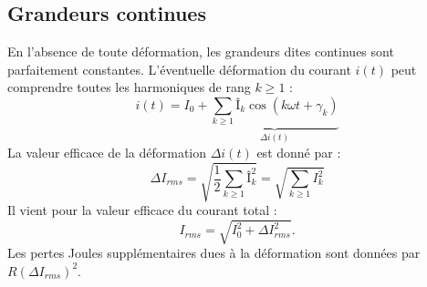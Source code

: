 	\subsection{Grandeurs continues}
		En l'absence de toute déformation, les grandeurs dites continues sont parfaitement constantes. L'éventuelle déformation du courant $i(t)$ peut comprendre toutes les harmoniques de rang $k\geq 1$ : 
		\begin{equation}
			i(t) = I_0 + \underbrace{\sum _{k\geq 1} Î_k \cos (k\omega t +\gamma _k)}_{\Delta i(t)}
		\end{equation}
		La valeur efficace de la déformation $\Delta i(t)$ est donné par : 
		\begin{equation}
			\Delta I_{rms} = \sqrt{\frac{1}{2}\sum _{k\geq 1} Î_k^2} = \sqrt{\sum _{k\geq 1} I_k^2}
		\end{equation}
		Il vient pour la valeur efficace du courant total : 
		\begin{equation}
			I_{rms} = \sqrt{I_0^2+\Delta I^2_{rms}}.
		\end{equation}
		Les pertes Joules supplémentaires dues à la déformation sont données par $R(\Delta I_{rms})^2$. 
		
